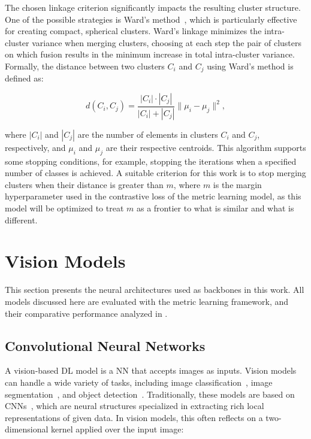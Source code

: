 The chosen linkage criterion significantly impacts the resulting cluster structure. One of the possible strategies is Ward's method~\cite{ward_jr_hierarchical_1963}, which is particularly effective for creating compact, spherical clusters. Ward's linkage minimizes the intra-cluster variance when merging clusters, choosing at each step the pair of clusters on which fusion results in the minimum increase in total intra-cluster variance. Formally, the distance between two clusters $C_i$ and $C_j$ using Ward's method is defined as:

\begin{equation}
d(C_i, C_j) = \frac{|C_i| \cdot |C_j|}{|C_i| + |C_j|} \|\mu_i - \mu_j\|^2,
\end{equation}

where $|C_i|$ and $|C_j|$ are the number of elements in clusters $C_i$ and $C_j$, respectively, and $\mu_i$ and $\mu_j$ are their respective centroids. This algorithm supports some stopping conditions, for example, stopping the iterations when a specified number of classes is achieved. A suitable criterion for this work is to stop merging clusters when their distance is greater than $m$, where $m$ is the margin hyperparameter used in the contrastive loss of the metric learning model, as this model will be optimized to treat $m$ as a frontier to what is similar and what is different.

\section{Vision Models}
\label{sec:vision_models}

This section presents the neural architectures used as backbones in this work. All models discussed here are evaluated with the metric learning framework, and their comparative performance analyzed in .

\subsection{Convolutional Neural Networks}

A vision-based \gls{DL} model is a \gls{NN} that accepts images as inputs. Vision models can handle a wide variety of tasks, including image classification~\cite{deng_imagenet_2009}, image segmentation~\cite{ronneberger_u-net_2015}, and object detection~\cite{redmon_you_2016}. Traditionally, these models are based on \glspl{CNN}~\cite{lecun_backpropagation_1989}, which are neural structures specialized in extracting rich local representations of given data. In vision models, this often reflects on a two-dimensional kernel applied over the input image:

